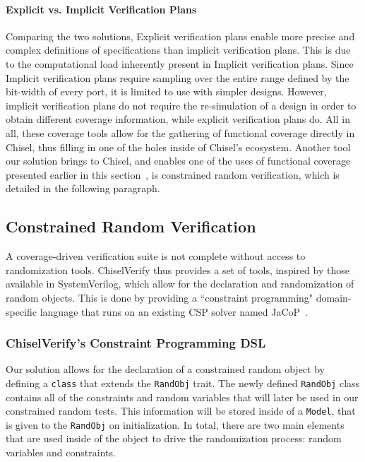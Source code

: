 \documentclass[conference]{IEEEtran}
\begin{document}
\paragraph{Explicit vs. Implicit Verification Plans}
Comparing the two solutions, Explicit verification plans enable more precise and complex definitions of specifications than implicit verification plans.
This is due to the computational load inherently present in Implicit verification plans. 
Since Implicit verification plans require sampling over the entire range defined by the bit-width of every port, it is limited to use with simpler designs.
However, implicit verification plans do not require the re-simulation of a design in order to obtain different coverage information, while explicit verification plans do.
All in all, these coverage tools allow for the gathering of functional coverage directly in Chisel, thus filling in one of the holes inside of Chisel's ecosystem.
Another tool our solution brings to Chisel, and enables one of the uses of functional coverage presented earlier in this section~\cite{verify:fuzzing:2021}, is constrained random verification, which is detailed in the following paragraph.

\subsection{Constrained Random Verification}
A coverage-driven verification suite is not complete without access to randomization tools.
ChiselVerify thus provides a set of tools, inspired by those available in SystemVerilog, which allow for the declaration and randomization of random objects.
This is done by providing a ``constraint programming" domain-specific language that runs on an existing CSP solver named JaCoP~\cite{jacop2013}.

\subsubsection{ChiselVerify's Constraint Programming DSL}
Our solution allows for the declaration of a constrained random object by defining a \texttt{class} that extends the \texttt{RandObj} trait.
The newly defined \texttt{RandObj} class contains all of the constraints and random variables that will later be used in our constrained random tests. 
This information will be stored inside of a \texttt{Model}, that is given to the \texttt{RandObj} on initialization.
In total, there are two main elements that are used inside of the object to drive the randomization process: random variables and constraints.
\end{document}
